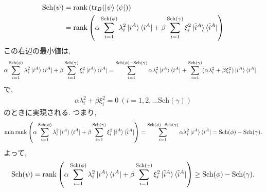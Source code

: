 \begin{problem}
\begin{align*}
    \mathrm{Sch}(\psi)
     & =
    \mathrm{rank} \left( \mathrm{tr}_B(\ket{\psi} \bra{\psi}) \right)
    \\
     & =
    \mathrm{rank}
    \left(
    \alpha \sum_{i=1}^{\mathrm{Sch}(\phi)} \lambda_i^2 \ket{i^A} \bra{i^A}
    +
    \beta \sum_{i=1}^{\mathrm{Sch}(\gamma)} \xi_i^2 \ket{\tilde{i}^A} \bra{\tilde{i}^A}
    \right)
\end{align*}
この右辺の最小値は,
\begin{align*}
    \alpha \sum_{i=1}^{\mathrm{Sch}(\phi)} \lambda_i^2 \ket{i^A} \bra{i^A}
    +
    \beta \sum_{i=1}^{\mathrm{Sch}(\gamma)} \xi_i^2 \ket{\tilde{i}^A} \bra{\tilde{i}^A}
     & =
    \sum_{i=1}^{\mathrm{Sch}(\phi) - \mathrm{Sch}(\gamma)} \alpha \lambda_i^2 \ket{i^A} \bra{i^A}
    +
    \sum_{i=1}^{\mathrm{Sch}(\gamma)} ( \alpha \lambda_i^2 + \beta \xi_i^2) \ket{\tilde{i}^A} \bra{\tilde{i}^A}
\end{align*}
で,
\begin{align*}
    \alpha \lambda_i^2 + \beta \xi_i^2 = 0 \ (i=1, 2, \dots \mathrm{Sch}(\gamma))
\end{align*}
のときに実現される. つまり,
\begin{align*}
    \min \mathrm{rank}
    \left(
    \alpha \sum_{i=1}^{\mathrm{Sch}(\phi)} \lambda_i^2 \ket{i^A} \bra{i^A}
    +
    \beta \sum_{i=1}^{\mathrm{Sch}(\gamma)} \xi_i^2 \ket{\tilde{i}^A} \bra{\tilde{i}^A}
    \right)
    =
    \sum_{i=1}^{\mathrm{Sch}(\phi) - \mathrm{Sch}(\gamma)} \alpha \lambda_i^2 \ket{i^A} \bra{i^A}
    =
    \mathrm{Sch}(\phi) - \mathrm{Sch}(\gamma).
\end{align*}
よって,
\begin{align*}
    \mathrm{Sch}(\psi) =
    \mathrm{rank}
    \left(
    \alpha \sum_{i=1}^{\mathrm{Sch}(\phi)} \lambda_i^2 \ket{i^A} \bra{i^A}
    +
    \beta \sum_{i=1}^{\mathrm{Sch}(\gamma)} \xi_i^2 \ket{\tilde{i}^A} \bra{\tilde{i}^A}
    \right)
    \geq  \mathrm{Sch}(\phi) - \mathrm{Sch}(\gamma).
\end{align*}
\end{problem}

